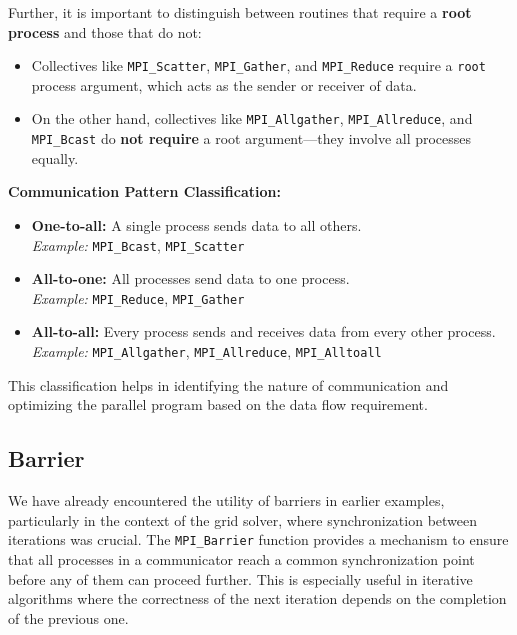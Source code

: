 \documentclass[12pt]{book}
\begin{document}
Further, it is important to distinguish between routines that require a \textbf{root process} and those that do not:
\begin{itemize}
    \item Collectives like \texttt{MPI\_Scatter}, \texttt{MPI\_Gather}, and \texttt{MPI\_Reduce} require a \texttt{root} process argument, which acts as the sender or receiver of data.
    \item On the other hand, collectives like \texttt{MPI\_Allgather}, \texttt{MPI\_Allreduce}, and \texttt{MPI\_Bcast} do \textbf{not require} a root argument—they involve all processes equally.
\end{itemize}

\vspace{1em}

\textbf{Communication Pattern Classification:}
\begin{itemize}
    \item \textbf{One-to-all:} A single process sends data to all others. \\
        \textit{Example:} \texttt{MPI\_Bcast}, \texttt{MPI\_Scatter}
    \item \textbf{All-to-one:} All processes send data to one process. \\
        \textit{Example:} \texttt{MPI\_Reduce}, \texttt{MPI\_Gather}
    \item \textbf{All-to-all:} Every process sends and receives data from every other process. \\
        \textit{Example:} \texttt{MPI\_Allgather}, \texttt{MPI\_Allreduce}, \texttt{MPI\_Alltoall}
\end{itemize}

This classification helps in identifying the nature of communication and optimizing the parallel program based on the data flow requirement.

\subsection{Barrier}

We have already encountered the utility of barriers in earlier examples, particularly in the context of the grid solver, where synchronization between iterations was crucial. The \texttt{MPI\_Barrier} function provides a mechanism to ensure that all processes in a communicator reach a common synchronization point before any of them can proceed further. This is especially useful in iterative algorithms where the correctness of the next iteration depends on the completion of the previous one.
 
\end{document}
